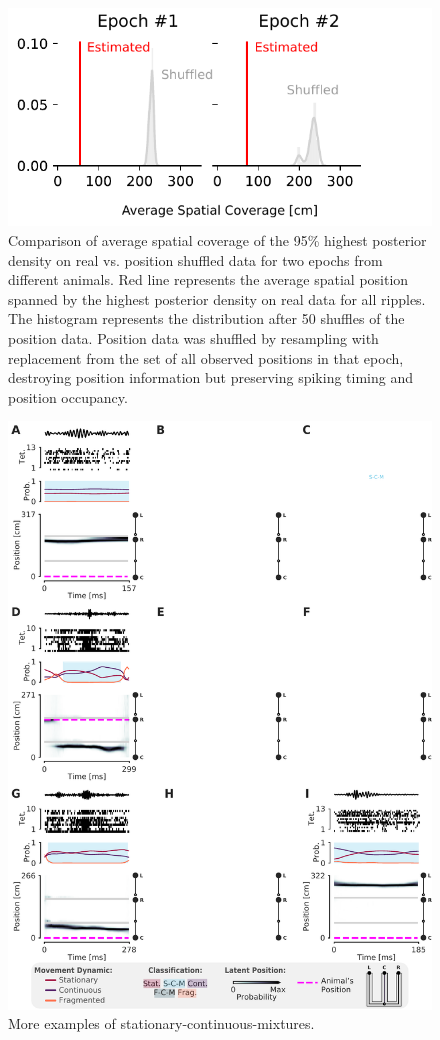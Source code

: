 \documentclass[times, twoside]{zHenriquesLab-StyleBioRxiv}
\begin{document}
\begin{figure}%
\centering
\includegraphics[width=0.80\linewidth]{figures/Figure4-supplemental1/Figure4_v1-supplemental1}
\caption{Comparison of average spatial coverage of the 95\% highest posterior density on real vs. position shuffled data for two epochs from different animals. Red line represents the average spatial position spanned by the highest posterior density on real data for all ripples. The histogram represents the distribution after 50 shuffles of the position data. Position data was shuffled by resampling with replacement from the set of all observed positions in that epoch, destroying position information but preserving spiking timing and position occupancy.}
\label{fig:Figure4-Figure supplement 1}
\end{figure}

\begin{figure}%
\centering
\includegraphics[width=0.80\linewidth]{figures/Figure5-supplemental1/Figure5_v1_supplemental1}
\caption{More examples of stationary-continuous-mixtures.}
\label{fig:Figure5-Figure supplement 1}
\end{figure}
\end{document}
